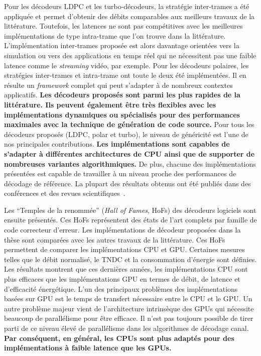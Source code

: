 Pour les décodeurs LDPC et les turbo-décodeurs, la stratégie inter-trames a été
appliquée et permet d'obtenir des débits comparables aux meilleurs travaux de la
littérature. Toutefois, les latences ne sont pas compétitives avec les
meilleures implémentations de type intra-trame que l'on trouve dans la
littérature. L'implémentation inter-trames proposée est alors davantage
orientées vers la simulation ou vers des applications en temps réel qui ne
nécessitent pas une faible latence comme le \emph{streaming} vidéo, par exemple.
Pour les décodeurs polaires, les stratégies inter-trames et intra-trame ont
toute le deux été implémentées. Il en résulte un \emph{framework} complet qui
peut s'adapter à de nombreux contextes applicatifs. \textbf{Les décodeurs
proposés sont parmi les plus rapides de la littérature. Ils peuvent également
être très flexibles avec les implémentations dynamiques ou spécialisés pour des
performances maximales avec la technique de génération de code source.} Pour
tous les décodeurs proposés (LDPC, polar et turbo), le niveau de généricité est
l'une de nos principales contributions. \textbf{Les implémentations sont
capables de s'adapter à différentes architectures de CPU ainsi que de supporter
de nombreuses variantes algorithmiques.} De plus, chacune des implémentations
présentées est capable de travailler à un niveau proche des performances de
décodage de référence. La plupart des résultats obtenus ont été publiés dans des
conférences et des revues scientifiques~\cite{Ghaffari2019,Leonardon2019,
Cassagne2015c,Cassagne2016b,Cassagne2016a}.

Les ``Temples de la renommée'' (\emph{Hall of Fames}, HoFs) des décodeurs
logiciels sont ensuite présentés. Ces HoFs représentent des états de l'art
complets par famille de code correcteur d'erreur. Les implémentations de
décodeur proposées dans la thèse sont comparées avec les autres travaux de la
littérature. Ces HoFs permettent de comparer les implémentations CPU et GPU.
Certaines mesures telles que le débit normalisé, le TNDC et la consommation
d'énergie sont définies. Les résultats montrent que ces dernières années, les
implémentations CPU sont plus efficaces que les implémentations GPU en termes de
débit, de latence et d'efficacité énergétique. L'un des principaux problèmes des
implémentations basées sur GPU est le temps de transfert nécessaire entre le
CPU et le GPU. Un autre problème majeur vient de l'architecture intrinsèque des
GPUs qui nécessite beaucoup de parallélisme pour être efficace. Il n'est pas
toujours possible de tirer parti de ce niveau élevé de parallélisme dans les
algorithmes de décodage canal. \textbf{Par conséquent, en général, les CPUs sont
plus adaptés pour des implémentations à faible latence que les GPUs.}

